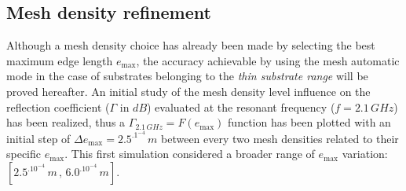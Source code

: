 \documentclass[12pt,a4paper,twocolumn]{article}
\begin{document}
{\subsection*{Mesh density refinement}
Although a mesh density choice has already been made by selecting the best maximum edge length $e_{\max}$, the accuracy achievable by using the mesh automatic mode in the case of substrates belonging to the  \emph{thin substrate range} will be proved hereafter. An initial study of the mesh density level influence on the reflection coefficient ($\Gamma$ in $dB$) evaluated at the resonant frequency ($f=2.1\,GHz$) has been realized, thus a  $\Gamma_{2.1\,GHz}=F(e_{\max})$ function has been plotted with an initial step of $\Delta e_{\max} = 2.5^.1^{-4}\,m$ between every two mesh densities related to their specific $e_{\max}$. This first simulation considered a broader range of $e_{\max}$ variation: $[2.5^.10^{-4}\,m\,,\,6.0^.10^{-4}\,m]$. 

\indent 

}
\end{document}
